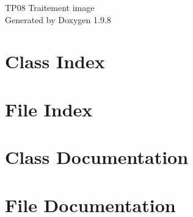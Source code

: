 \documentclass[twoside]{book}
\newcommand{\+}{\discretionary{\mbox{\scriptsize$\hookleftarrow$}}{}{}}
\newcommand{\clearemptydoublepage}{%
    \newpage{\pagestyle{empty}\cleardoublepage}%
  }
\begin{document}
  \raggedbottom
    \hypersetup{pageanchor=false,
                bookmarksnumbered=true,
                pdfencoding=unicode
               }
  \begin{titlepage}
  \vspace*{7cm}
  \begin{center}%
  {\Large TP08 Traitement image}\\
  \vspace*{1cm}
  {\large Generated by Doxygen 1.9.8}\\
  \end{center}
  \end{titlepage}
  \clearemptydoublepage
  \tableofcontents
  \clearemptydoublepage
  \hypersetup{pageanchor=true}
\chapter{Class Index}

\chapter{File Index}

\chapter{Class Documentation}

\chapter{File Documentation}











  \backmatter
  \newpage
  \clearemptydoublepage
  \printindex
\end{document}
